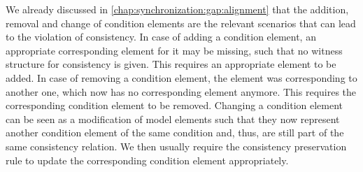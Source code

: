 


We already discussed in \autoref{chap:synchronization:gap:alignment} that the addition, removal and change of condition elements are the relevant scenarios that can lead to the violation of consistency.
In case of adding a condition element, an appropriate corresponding element for it may be missing, such that no witness structure for consistency is given.
This requires an appropriate element to be added.
In case of removing a condition element, the element was corresponding to another one, which now has no corresponding element anymore.
This requires the corresponding condition element to be removed.
Changing a condition element can be seen as a modification of model elements such that they now represent another condition element of the same condition and, thus, are still part of the same consistency relation.
We then usually require the consistency preservation rule to update the corresponding condition element appropriately.

